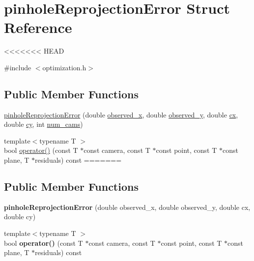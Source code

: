 \hypertarget{structpinholeReprojectionError}{\section{pinhole\-Reprojection\-Error Struct Reference}
\label{d7/d5b/structpinholeReprojectionError}
}
<<<<<<< HEAD


{\ttfamily \#include $<$optimization.\-h$>$}

\subsection*{Public Member Functions}
\begin{DoxyCompactItemize}
\item 
\hyperlink{structpinholeReprojectionError_a2b39d76ebedd7164b5d37899f695d33b}{pinhole\-Reprojection\-Error} (double \hyperlink{structpinholeReprojectionError_adc28355ad6705458a73690c6c904d478}{observed\-\_\-x}, double \hyperlink{structpinholeReprojectionError_ab1876f1f22f1648d1621dfc53046a329}{observed\-\_\-y}, double \hyperlink{structpinholeReprojectionError_a2f550c74a75d53ba0d1b2fc3a9c3d4c1}{cx}, double \hyperlink{structpinholeReprojectionError_af979ca78cb6350ffe5da1783c1344a09}{cy}, int \hyperlink{structpinholeReprojectionError_aaa8f2e269d0825892f73ed4691194fba}{num\-\_\-cams})
\item 
{\footnotesize template$<$typename T $>$ }\\bool \hyperlink{structpinholeReprojectionError_a31a0aae8c92365c7dc02bc95bb022005}{operator()} (const T $\ast$const camera, const T $\ast$const point, const T $\ast$const plane, T $\ast$residuals) const 
=======
\subsection*{Public Member Functions}
\begin{DoxyCompactItemize}
\item 
\hypertarget{structpinholeReprojectionError_a79bf2042aaf3f574cdc09c463a880728}{{\bfseries pinhole\-Reprojection\-Error} (double observed\-\_\-x, double observed\-\_\-y, double cx, double cy)}\label{d7/d5b/structpinholeReprojectionError_a79bf2042aaf3f574cdc09c463a880728}

\item 
\hypertarget{structpinholeReprojectionError_a31a0aae8c92365c7dc02bc95bb022005}{{\footnotesize template$<$typename T $>$ }\\bool {\bfseries operator()} (const T $\ast$const camera, const T $\ast$const point, const T $\ast$const plane, T $\ast$residuals) const }\label{d7/d5b/structpinholeReprojectionError_a31a0aae8c92365c7dc02bc95bb022005}


\end{DoxyCompactItemize}
\end{DoxyCompactItemize}
